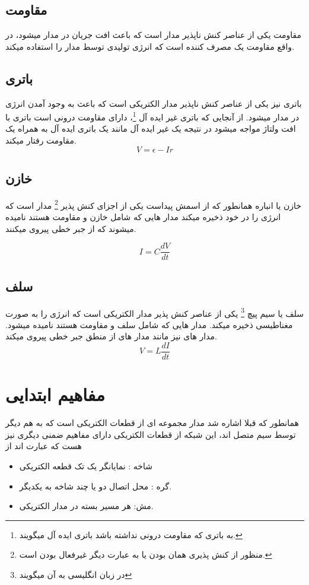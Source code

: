 \subsection{مقاومت}
مقاومت یکی از عناصر کنش ناپذیر مدار است که باعث افت جریان در مدار میشود،
در واقع مقاومت یک مصرف کننده است که انرژی تولیدی توسط مدار را استفاده میکند.
\subsection{باتری}
باتری نیز یکی از عناصر کنش ناپذیر مدار الکتریکی است که باعث به وجود آمدن انرژی در مدار میشود.
از آنجایی که باتری غیر ایده آل
\footnote{	به باتری که مقاومت درونی نداشته باشد باتری ایده آل میگویند.	}، 
دارای مقاومت درونی است باتری با افت ولتاژ مواجه میشود در نتیجه یک غیر ایده آل مانند یک باتری ایده آل به همراه یک مقاومت رفتار میکند.
\begin{equation}\label{eq:ohm}
	V=\epsilon - {I}{r}
\end{equation}
\subsection{خازن}
خازن یا انباره همانطور که از اسمش پیداست یکی از اجزای کنش پذیر
\footnote{منظور از کنش پذیری همان 
	بودن یا به عبارت دیگر غیرفعال بودن است.
}
مدار است که انرژی را در خود ذخیره میکند
مدار هایی که شامل خازن و مقاومت هستند
نامیده میشوند که از جبر خطی پیروی میکنند.

\begin{equation}\label{eq:capcur}
	I={C}\frac{dV}{dt}
\end{equation}
\subsection{سلف}
سلف یا سیم پیچ
\footnote{در زبان انگلیسی به آن
	میگویند}
یکی از عناصر کنش پذیر مدار الکتریکی است که انرژی را به صورت مغناطیسی ذخیره میکند.
مدار هایی که شامل سلف و مقاومت هستند
نامیده میشود.
مدار های
نیز مانند مدار های
از منطق جبر خطی پیروی میکند.
\begin{equation}\label{eq:slcur}
	V={L}\frac{dI}{dt}
\end{equation}

\section{مفاهیم ابتدایی}
همانطور که قبلا اشاره شد مدار مجموعه ای از قطعات الکتریکی است که به هم دیگر توسط سیم متصل اند،
این شبکه از قطعات الکتریکی دارای مفاهیم ضمنی دیگری نیز هست که عبارت اند از
\cite{Alexander13}
\begin{itemize}
	\item
	شاخه : نمایانگر یک تک قطعه الکتریکی
	\item
	گره : محل اتصال دو یا چند شاخه به یکدیگر.
	\item
	مش: هر مسیر بسته در مدار الکتریکی.
	
\end{itemize}


